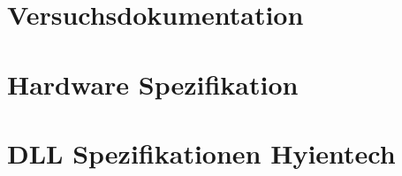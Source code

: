 \chapter{Versuchsdokumentation}
\label{app:ch:versuche}
\chapter{Hardware Spezifikation}
\label{app:ch:hardwarespez}


\chapter{DLL Spezifikationen Hyientech}
\label{app:ch:dllspezifikation}
